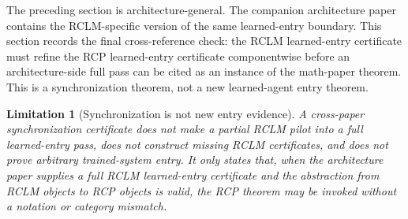 \documentclass[11pt]{article}
\newtheorem{limitation}[theorem]{Limitation}
\newcommand{\1}{\mathbf{1}}
\begin{document}
The preceding section is architecture-general.  The companion architecture paper contains the RCLM-specific version of the same learned-entry boundary.  This section records the final cross-reference check: the RCLM learned-entry certificate must refine the RCP learned-entry certificate componentwise before an architecture-side full pass can be cited as an instance of the math-paper theorem.  This is a synchronization theorem, not a new learned-agent entry theorem.

\begin{limitation}[Synchronization is not new entry evidence]
\label{lim:m3_sync_not_new_evidence}
A cross-paper synchronization certificate does not make a partial RCLM pilot into a full learned-entry pass, does not construct missing RCLM certificates, and does not prove arbitrary trained-system entry.  It only states that, when the architecture paper supplies a full RCLM learned-entry certificate and the abstraction from RCLM objects to RCP objects is valid, the RCP theorem may be invoked without a notation or category mismatch.
\end{limitation}
\end{document}
